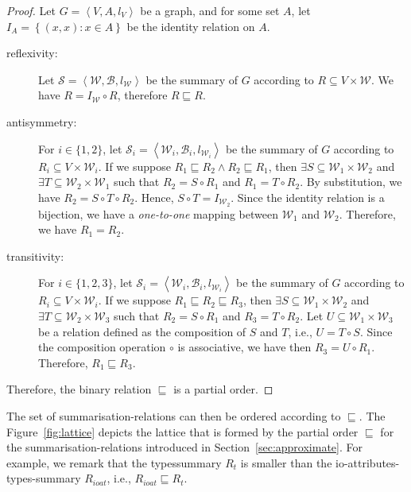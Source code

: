 \begin{proof}
	Let $G=\left\langle V, A, l_V \right\rangle$ be a graph, and for some set $A$, let $I_A = \left\lbrace (x, x) : x \in A \right\rbrace$ be the identity relation on $A$.
	\begin{description}
		\item[reflexivity:] Let $\mathcal{S} = \left\langle \mathcal{W}, \mathcal{B}, l_{\mathcal{W}} \right\rangle$ be the summary of $G$ according to $R \subseteq V \times \mathcal{W}$. We have $R = I_\mathcal{W} \circ R$, therefore $R \sqsubseteq R$.
		\item[antisymmetry:] For $i \in \{1, 2\}$, let $\mathcal{S}_i = \left\langle \mathcal{W}_i, \mathcal{B}_i, l_{\mathcal{W}_i} \right\rangle$ be the summary of $G$ according to $R_i \subseteq V \times \mathcal{W}_i$. If we suppose $R_1 \sqsubseteq R_2 \wedge R_2 \sqsubseteq R_1$, then $\exists S \subseteq \mathcal{W}_1 \times \mathcal{W}_2$ and $\exists T \subseteq \mathcal{W}_2 \times \mathcal{W}_1$ such that $R_2 = S \circ R_1$ and $R_1 = T \circ R_2$. By substitution, we have $R_2 = S \circ T \circ R_2$. Hence, $S \circ T = I_{\mathcal{W}_2}$. Since the identity relation is a bijection, we have a \emph{one-to-one} mapping between $\mathcal{W}_1$ and $\mathcal{W}_2$. Therefore, we have $R_1 = R_2$.
		\item[transitivity:] For $i \in \{1, 2, 3\}$, let $\mathcal{S}_i = \left\langle \mathcal{W}_i, \mathcal{B}_i, l_{\mathcal{W}_i} \right\rangle$ be the summary of $G$ according to $R_i \subseteq V \times \mathcal{W}_i$. If we suppose $R_1 \sqsubseteq R_2 \sqsubseteq R_3$, then $\exists S \subseteq \mathcal{W}_1 \times \mathcal{W}_2$ and $\exists T \subseteq \mathcal{W}_2 \times \mathcal{W}_3$ such that $R_2 = S \circ R_1$ and $R_3 = T \circ R_2$. Let $U \subseteq \mathcal{W}_1 \times \mathcal{W}_3$ be a relation defined as the composition of $S$ and $T$, i.e., $U = T \circ S$. Since the composition operation $\circ$ is associative, we have then $R_3 = U \circ R_1$. Therefore, $R_1 \sqsubseteq R_3$.
	\end{description}
	Therefore, the binary relation $\sqsubseteq$ is a partial order.
\end{proof}

The set of \glspl{summarisation-relation} can then be ordered according to $\sqsubseteq$. The Figure~\ref{fig:lattice} depicts the lattice that is formed by the partial order $\sqsubseteq$ for the \glspl{summarisation-relation} introduced in Section~\ref{sec:approximate}. For example, we remark that the \gls{typessummary} $R_t$ is smaller than the \gls{io-attributes-types-summary} $R_{ioat}$, i.e., $R_{ioat} \sqsubseteq R_t$.

